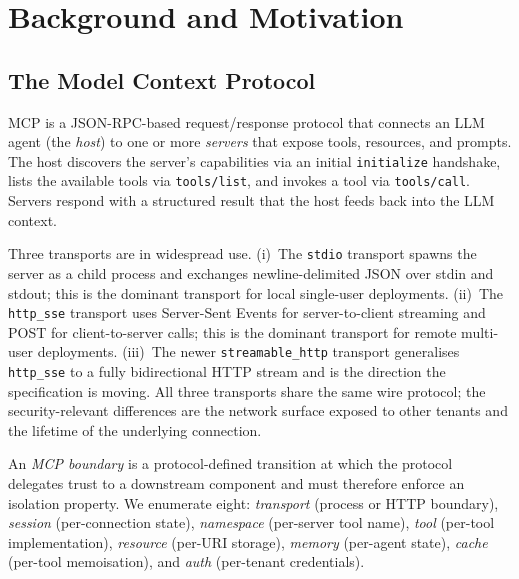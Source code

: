 \documentclass[sigconf, anonymous, natbib=false]{acmart}
\begin{document}
\section{Background and Motivation}\label{sec:background}

\subsection{The Model Context Protocol}

MCP is a JSON-RPC-based request/response protocol that
connects an LLM agent (the \emph{host}) to one or more
\emph{servers} that expose tools, resources, and prompts. The
host discovers the server's capabilities via an initial
\texttt{initialize} handshake, lists the available tools via
\texttt{tools/list}, and invokes a tool via
\texttt{tools/call}. Servers respond with a structured
result that the host feeds back into the LLM context.

Three transports are in widespread use. (i)~The
\texttt{stdio} transport spawns the server as a child
process and exchanges newline-delimited JSON over stdin and
stdout; this is the dominant transport for local
single-user deployments. (ii)~The \texttt{http\_sse}
transport uses Server-Sent Events for server-to-client
streaming and POST for client-to-server calls; this is the
dominant transport for remote multi-user deployments.
(iii)~The newer \texttt{streamable\_http} transport
generalises \texttt{http\_sse} to a fully bidirectional
HTTP stream and is the direction the specification is
moving. All three transports share the same wire protocol;
the security-relevant differences are the network surface
exposed to other tenants and the lifetime of the underlying
connection.

\begin{definition}
An \emph{MCP boundary} is a protocol-defined transition at
which the protocol delegates trust to a downstream
component and must therefore enforce an isolation property.
We enumerate eight: \emph{transport} (process or HTTP
boundary), \emph{session} (per-connection state), \emph{
namespace} (per-server tool name), \emph{tool} (per-tool
implementation), \emph{resource} (per-URI storage),
\emph{memory} (per-agent state), \emph{cache} (per-tool
memoisation), and \emph{auth} (per-tenant credentials).
\end{definition}
\end{document}
